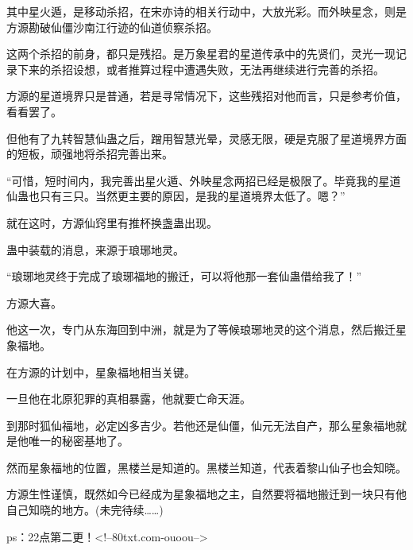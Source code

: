 \begin{this_body}
其中星火遁，是移动杀招，在宋亦诗的相关行动中，大放光彩。而外映星念，则是方源勘破仙僵沙南江行迹的仙道侦察杀招。

这两个杀招的前身，都只是残招。是万象星君的星道传承中的先贤们，灵光一现记录下来的杀招设想，或者推算过程中遭遇失败，无法再继续进行完善的杀招。

方源的星道境界只是普通，若是寻常情况下，这些残招对他而言，只是参考价值，看看罢了。

但他有了九转智慧仙蛊之后，蹭用智慧光晕，灵感无限，硬是克服了星道境界方面的短板，顽强地将杀招完善出来。

“可惜，短时间内，我完善出星火遁、外映星念两招已经是极限了。毕竟我的星道仙蛊也只有三只。当然更主要的原因，是我的星道境界太低了。嗯？”

就在这时，方源仙窍里有推杯换盏蛊出现。

蛊中装载的消息，来源于琅琊地灵。

“琅琊地灵终于完成了琅琊福地的搬迁，可以将他那一套仙蛊借给我了！”

方源大喜。

他这一次，专门从东海回到中洲，就是为了等候琅琊地灵的这个消息，然后搬迁星象福地。

在方源的计划中，星象福地相当关键。

一旦他在北原犯罪的真相暴露，他就要亡命天涯。

到那时狐仙福地，必定凶多吉少。若他还是仙僵，仙元无法自产，那么星象福地就是他唯一的秘密基地了。

然而星象福地的位置，黑楼兰是知道的。黑楼兰知道，代表着黎山仙子也会知晓。

方源生性谨慎，既然如今已经成为星象福地之主，自然要将福地搬迁到一块只有他自己知晓的地方。(未完待续……)

ps：22点第二更！<!--80txt.com-ouoou-->

\end{this_body}


